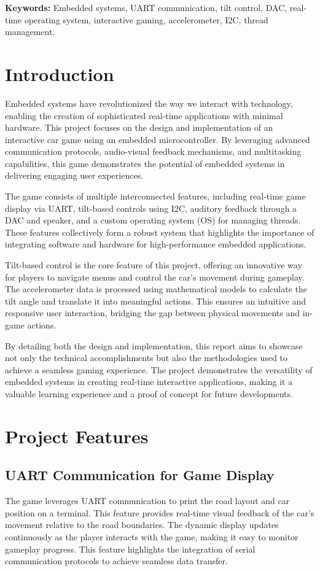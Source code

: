\documentclass[conference]{IEEEtran}
\begin{document}
\textbf{Keywords:} Embedded systems, UART communication, tilt control, DAC, real-time operating system, interactive gaming, accelerometer, I2C, thread management.

\section{Introduction}
Embedded systems have revolutionized the way we interact with technology, enabling the creation of sophisticated real-time applications with minimal hardware. This project focuses on the design and implementation of an interactive car game using an embedded microcontroller. By leveraging advanced communication protocols, audio-visual feedback mechanisms, and multitasking capabilities, this game demonstrates the potential of embedded systems in delivering engaging user experiences.

The game consists of multiple interconnected features, including real-time game display via UART, tilt-based controls using I2C, auditory feedback through a DAC and speaker, and a custom operating system (OS) for managing threads. These features collectively form a robust system that highlights the importance of integrating software and hardware for high-performance embedded applications.

Tilt-based control is the core feature of this project, offering an innovative way for players to navigate menus and control the car's movement during gameplay. The accelerometer data is processed using mathematical models to calculate the tilt angle and translate it into meaningful actions. This ensures an intuitive and responsive user interaction, bridging the gap between physical movements and in-game actions.

By detailing both the design and implementation, this report aims to showcase not only the technical accomplishments but also the methodologies used to achieve a seamless gaming experience. The project demonstrates the versatility of embedded systems in creating real-time interactive applications, making it a valuable learning experience and a proof of concept for future developments.

\section{Project Features}
\subsection{UART Communication for Game Display}
The game leverages UART communication to print the road layout and car position on a terminal. This feature provides real-time visual feedback of the car's movement relative to the road boundaries. The dynamic display updates continuously as the player interacts with the game, making it easy to monitor gameplay progress. This feature highlights the integration of serial communication protocols to achieve seamless data transfer.
\end{document}
